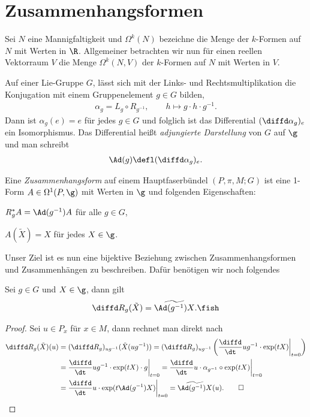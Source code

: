 \documentclass[%
	paper=a5,%
	fleqn,%
	DIV=18,%
	BCOR=0mm,
	fontsize=11pt,
	titlepage=false,%
	bibliography=totoc,
	DIV=18,%
	twoside=true,
	pdftitle=Riemannsche Geometrie,
	pdfauthor=Uwe Semmelmann,
	numbers=noendperiod]%
	{scrbook}
\begin{document}
\section{Zusammenhangsformen}

Sei $N$ eine Mannigfaltigkeit und $\Omega^k(N)$ bezeichne die Menge der
$k$-Formen auf $N$ mit Werten in $\R$. Allgemeiner betrachten wir nun für einen
reellen Vektorraum $V$ die Menge $\Omega^k(N,V)$ der $k$-Formen auf $N$ mit
Werten in $V$.

Auf einer Lie-Gruppe $G$, lässt sich mit der Links- und Rechtsmultiplikation
die Konjugation mit einem Gruppenelement $g\in G$  bilden,
\begin{align*}
\alpha_g = L_g\circ R_{g^{-1}},\qquad h\mapsto g\cdot h\cdot g^{-1}.
\end{align*}
Dann ist $\alpha_g(e) = e$ für jedes $g\in G$ und folglich ist das
Differential $(\diffd \alpha_g)_e$ ein Isomorphismus. Das Differential heißt
\emph{adjungierte Darstellung} von $G$ auf $\g$ und man schreibt
\begin{align*}
\Ad(g) \defl (\diffd\alpha_g)_e.
\end{align*}

\begin{defn}
\label{defn:Zusammenhangsform}
Eine \emph{Zusammenhangsform} auf einem Hauptfaserbündel $(P,\pi,M;G)$ ist eine
1-Form $A\in\Omega^1(P,\g)$ mit Werten in $\g$ und folgenden Eigenschaften:
\begin{defnenum}
\item $R_g^*A = \Ad(g^{-1})A$ für alle $g\in G$,
\item $A(\tilde{X}) = X$ für jedes $X\in \g$.
\end{defnenum}
\end{defn}

Unser Ziel ist es nun eine bijektive Beziehung zwischen Zusammenhangsformen und
Zusammenhängen zu beschreiben. Dafür benötigen wir noch folgendes

\begin{lem}
\label{lem:Rechts-Translation-Fundamentales-Vektorfeld}
Sei $g\in G$ und $X\in \g$, dann gilt
\begin{align*}
\diffd R_g(\tilde{X}) = \widetilde{\Ad(g^{-1})X}.\fish
\end{align*}
\end{lem}
\begin{proof}
Sei $u\in P_x$ für $x\in M$, dann rechnet man direkt nach
\begin{align*}
\diffd R_g(\tilde{X})(u) &= 
(\diffd R_{g})_{ug^{-1}}(\tilde{X}(ug^{-1})) = 
(\diffd R_{g})_{ug^{-1}}\left(\frac{\diffd}{\dt}
ug^{-1}\cdot\exp(tX)\bigg|_{t=0} \right)\\
&= \frac{\diffd}{\dt}
ug^{-1}\cdot\exp(tX)\cdot g\bigg|_{t=0}
= \frac{\diffd}{\dt} u\cdot \alpha_{g^{-1}}\circ\exp(tX)\bigg|_{t=0}\\
&= \frac{\diffd}{\dt} u\cdot \exp(t\Ad(g^{-1})X) \bigg|_{t=0}
= \widetilde{\Ad(g^{-1})X}(u).\qed
\end{align*}
\end{proof}
\end{document}
